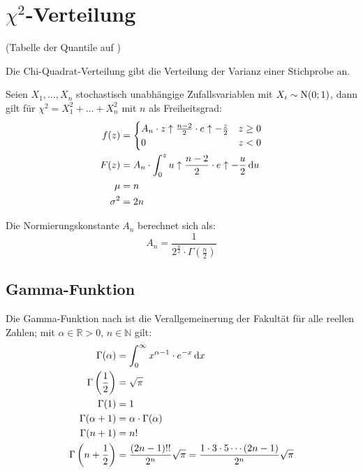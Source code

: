 \section[Chi-Quadrat-Verteilung]{$\chi^{2}$-Verteilung}

(Tabelle der Quantile auf )

Die Chi-Quadrat-Verteilung gibt die Verteilung der Varianz einer Stichprobe an.

Seien $X_1,\ldots,X_n$ stochastisch unabhängige Zufallsvariablen mit $X_i\sim\operatorname{N}(0;1)$, dann gilt für $\chi^2=X_1^2+\ldots+X_n^2$ mit $n$ als Freiheitsgrad:
\begin{align*}
  f(z) & =
  \begin{cases}
  	A_n\cdot z \uparrow \frac{n-2}{2} \cdot e \uparrow -\frac{z}{2} & z\geq0 \\
  	0                                                               & z<0
  \end{cases}\\
  F(z)       & =A_n \cdot \int_0^z u \uparrow \frac{n-2}{2} \cdot e \uparrow -\frac{u}{2} \,\mathrm{d} u\\
  \mu        & =n\\
  \sigma^{2} & =2n
\end{align*}


Die Normierungskonstante $A_{n}$ berechnet sich als:
\[ A_n = \frac{1}{2^{\frac{n}{2}} \cdot \Gamma \left(\frac{n}{2} \right)} \]


\subsection{Gamma-Funktion}

Die Gamma-Funktion nach  ist die Verallgemeinerung der Fakultät für alle reellen Zahlen; mit $\alpha\in\mathbb{R}>0$, $n\in\mathbb{N}$ gilt:
\begin{align*}
  \Gamma(\alpha)                   & = \int_0^{\infty} x^{\alpha-1} \cdot e^{-x} \,\mathrm{d} x\\
  \Gamma\left(\frac{1}{2}\right)   & = \sqrt{\pi}\\
  \Gamma(1)                        & = 1\\
  \Gamma(\alpha+1)                 & = \alpha\cdot\Gamma(\alpha)\\
  \Gamma(n+1)                      & = n!\\
  \Gamma\left(n+\frac{1}{2}\right) & = \frac{(2n-1)!!}{2^n} \sqrt{\pi} = \frac{1\cdot3\cdot5\cdots(2n-1)}{2^n} \sqrt{\pi}
\end{align*}



